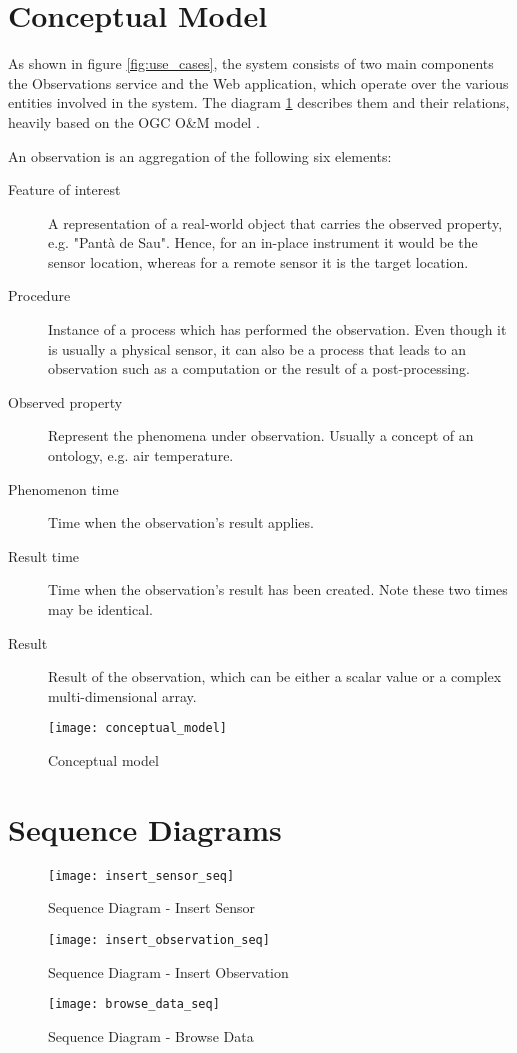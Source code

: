 \section{Conceptual Model}

As shown in figure \ref{fig:use_cases}, the system consists of two main components the Observations service and the Web application, which operate over the various entities involved in the system. The diagram \ref{fig:conceptual_model} describes them and their relations, heavily based on the OGC O\&M model \cite{OM}.

An observation is an aggregation of the following six elements:

\begin{description}
\item[Feature of interest] A representation of a real-world object that carries the observed property, e.g. "Pant\`a de Sau". Hence, for an in-place instrument it would be the sensor location, whereas for a remote sensor it is the target location.
\item[Procedure] Instance of a process which has performed the observation. Even though it is usually a physical sensor, it can also be a process that leads to an observation such as a computation or the result of a post-processing.
\item[Observed property] Represent the phenomena under observation. Usually a concept of an ontology, e.g. air temperature.
\item[Phenomenon time] Time when the observation's result applies.
\item[Result time] Time when the observation's result has been created. Note these two times may be identical.
\item[Result] Result of the observation, which can be either a scalar value or a complex multi-dimensional array.
\end{description}

\begin{figure}[ht]
	\centering
	\texttt{[image: conceptual\_model]}
	\caption{Conceptual model}
	\label{fig:conceptual_model}
\end{figure}
\newpage

\section{Sequence Diagrams}

\begin{figure}[ht]
	\centering
	\texttt{[image: insert\_sensor\_seq]}
	\caption{Sequence Diagram - Insert Sensor}
	\label{fig:insert_sensor_seq}
\end{figure}

\begin{figure}[ht]
	\centering
	\texttt{[image: insert\_observation\_seq]}
	\caption{Sequence Diagram - Insert Observation}
	\label{fig:insert_observation_seq}
\end{figure}

\begin{figure}[ht]
	\centering
	\texttt{[image: browse\_data\_seq]}
	\caption{Sequence Diagram - Browse Data}
	\label{fig:browse_data_seq}
\end{figure}
